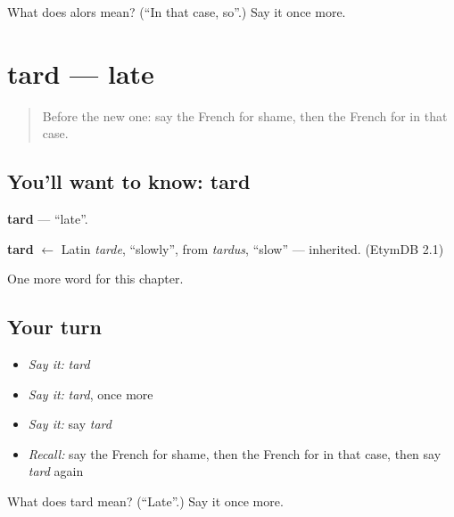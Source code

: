 \begin{tcolorbox}[breakable,colback=teal!4,colframe=teal!35!black,title={Before you move on}]
What does alors mean? (\textquotedblleft{}In that case, so\textquotedblright{}.) Say it once more.
\end{tcolorbox}
\section[tard]{tard — late}

\label{lesson:FR-C187-tard}



\begin{quote}
Before the new one: say the French for shame, then the French for in that case.
\end{quote}

\subsection*{You'll want to know: tard}
\textbf{tard} — \textquotedblleft{}late\textquotedblright{}.

\begin{cousinweb}
\textbf{tard} $\leftarrow$ Latin \emph{tarde}, \textquotedblleft{}slowly\textquotedblright{}, from \emph{tardus}, \textquotedblleft{}slow\textquotedblright{} — inherited. (EtymDB 2.1)
\end{cousinweb}

\begin{grammarlens}[title={What you've built}]
One more word for this chapter.
\end{grammarlens}

\subsection*{Your turn}
\begin{itemize}
\raggedright
  \item \emph{Say it:} \emph{tard}
  \item \emph{Say it:} \emph{tard}, once more
  \item \emph{Say it:} say \emph{tard}
  \item \emph{Recall:} say the French for shame, then the French for in that case, then say \emph{tard} again
\end{itemize}

\begin{tcolorbox}[breakable,colback=teal!4,colframe=teal!35!black,title={Before you move on}]
What does tard mean? (\textquotedblleft{}Late\textquotedblright{}.) Say it once more.
\end{tcolorbox}
